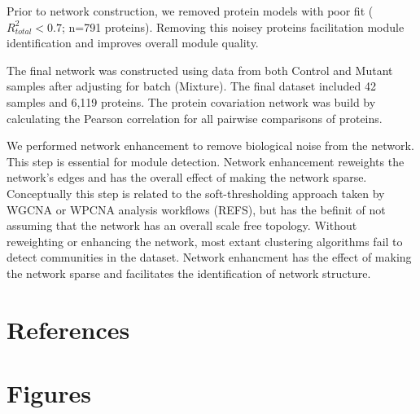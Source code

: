 \documentclass[11pt]{elife}\usepackage[]{graphicx}\usepackage[]{color}
\begin{document}
Prior to network construction, we removed protein models with poor fit 
($R^2_{total}<0.7$; n=791 proteins). Removing this noisey proteins facilitation
module identification and improves overall module quality.

The final network was constructed using data from both Control and Mutant 
samples after adjusting for batch (Mixture). The final dataset included 
42 samples and 6,119 proteins. The protein covariation network was build by
calculating the Pearson correlation for all pairwise comparisons of proteins.

We performed network enhancement to remove biological noise from the network.
This step is essential for module detection. Network enhancement reweights the
network's edges and has the overall effect of making the network sparse.
Conceptually this step is related to the soft-thresholding approach taken by
WGCNA or WPCNA analysis workflows (REFS), but has the befinit of not assuming
that the network has an overall scale free topology.  Without reweighting or
enhancing the network, most extant clustering algorithms fail to detect
communities in the dataset.  Network enhancment has the effect of making the
network sparse and facilitates the identification of network structure.


\section{References}




\section{Figures}


\end{document}

